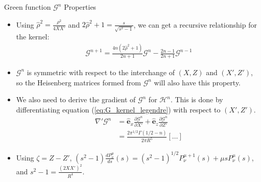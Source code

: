 \documentclass[8pt]{beamer}
\begin{document}
\begin{frame}{\color{white} Green function $\mathcal{G}^n$ Properties}
\begin{itemize}
    \item Using $\hat{\rho}^2 = \frac{\rho^2}{4XX'}$ and $2\hat{\rho}^2+1 = \frac{s}{\sqrt{s^2-1}}$, we can get a recursive relationship for the kernel:
    \begin{align}
         \mathcal{G}^{n+1} = \frac{4n(2\hat{\rho}^2+1)}{2n+1} \mathcal{G}^n - \frac{2n-1}{2n+1}\mathcal{G}^{n-1} \label{eq:recursive_G}
    \end{align}
    \item $\mathcal{G}^n$ is symmetric with respect to the interchange of $(X,Z)$ and $(X',Z')$, so the Heisenberg matrices formed from $\mathcal{G}^n$ will also have this property.
    \item We also need to derive the gradient of $\mathcal{G}^n$ for $\mathcal{H}^n$. This is done by differentiating equation (\ref{eq:G_kernel_legendre}) with respect to $(X',Z')$.
    \begin{align}
    \nabla' \mathcal{G}^n &= \hat{\mathbf{e}}_x \frac{\partial \mathcal{G}^n}{\partial X'} + \hat{\mathbf{e}}_z \frac{\partial \mathcal{G}^n}{\partial Z'} \\
    &= \frac{2\pi^{1/2}\Gamma(1/2-n)}{2\pi R^5} \left[ \dots \right] \nonumber %
    \end{align}
    \item Using $\zeta = Z-Z'$, $\left(s^2 - 1\right) \frac{d P_\nu^\mu}{ds}(s) = \left(s^2 - 1\right)^{1/2} P_\nu^{\mu+1}(s) + \mu s P_\nu^\mu(s)$, and $s^2 - 1 = \frac{(2XX')^2}{R^4}$.
\end{itemize}
\end{frame}
\end{document}
